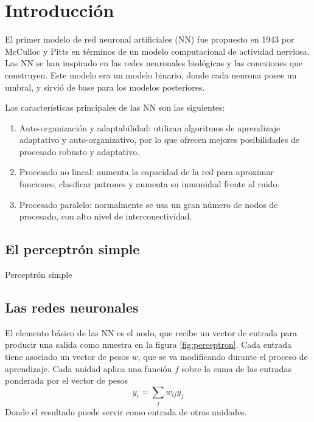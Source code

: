 

\section{Introducción}
El primer modelo de red neuronal artificiales (NN) fue propuesto en 1943 por McCulloc y Pitts en términos de un modelo computacional de actividad nerviosa. Las NN se han inspirado en las redes neuronales biológicas y las conexiones que construyen. Este modelo era un modelo binario, donde cada neurona posee un umbral, y sirvió de base para los modelos posteriores.

Las características principales de las NN son las siguientes:
\begin{enumerate}
	\item Auto-organización y adaptabilidad: utilizan algoritmos de aprendizaje adaptativo y auto-organizativo, por lo que ofrecen mejores posibilidades de procesado robusto y adaptativo.

	\item Procesado no lineal: aumenta la capacidad de la red para aproximar funciones, clasificar patrones y aumenta su inmunidad frente al ruido.

	\item Procesado paralelo: normalmente se usa un gran número de nodos de procesado, con alto nivel de interconectividad.
\end{enumerate}

\subsection{El perceptrón simple}
\begin{imagen}
	\scalebox{1.5}{}
	\caption{Perceptrón simple}
	\label{fig:perceptron}
\end{imagen}

\subsection{Las redes neuronales}
El elemento básico de las NN es el nodo, que recibe un vector de entrada para producir una salida como muestra en la figura \ref{fig:perceptron}. Cada entrada tiene asociado un vector de pesos $w$, que se va modificando durante el proceso de aprendizaje. Cada unidad aplica una función $f$ sobre la suma de las entradas ponderada por el vector de pesos
$$ y_{i} = \sum_{j} w_{ij}y_{j} $$
Donde el resultado puede servir como entrada de otras unidades.

